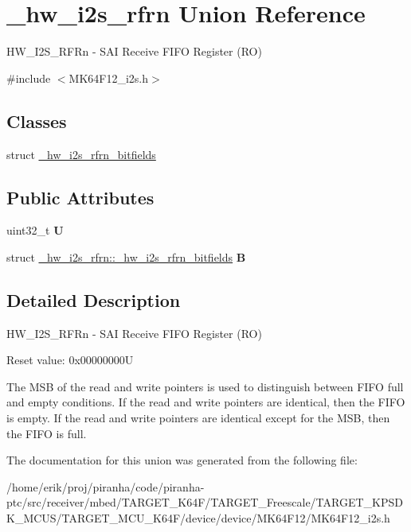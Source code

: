 \hypertarget{union__hw__i2s__rfrn}{}\section{\+\_\+hw\+\_\+i2s\+\_\+rfrn Union Reference}
\label{union__hw__i2s__rfrn}


H\+W\+\_\+\+I2\+S\+\_\+\+R\+F\+Rn -\/ S\+AI Receive F\+I\+FO Register (RO)  




{\ttfamily \#include $<$M\+K64\+F12\+\_\+i2s.\+h$>$}

\subsection*{Classes}
\begin{DoxyCompactItemize}
\item 
struct \hyperlink{struct__hw__i2s__rfrn_1_1__hw__i2s__rfrn__bitfields}{\+\_\+hw\+\_\+i2s\+\_\+rfrn\+\_\+bitfields}
\end{DoxyCompactItemize}
\subsection*{Public Attributes}
\begin{DoxyCompactItemize}
\item 
uint32\+\_\+t {\bfseries U}\hypertarget{union__hw__i2s__rfrn_a79e7873c4dde1c509c0311c74abdf212}{}\label{union__hw__i2s__rfrn_a79e7873c4dde1c509c0311c74abdf212}

\item 
struct \hyperlink{struct__hw__i2s__rfrn_1_1__hw__i2s__rfrn__bitfields}{\+\_\+hw\+\_\+i2s\+\_\+rfrn\+::\+\_\+hw\+\_\+i2s\+\_\+rfrn\+\_\+bitfields} {\bfseries B}\hypertarget{union__hw__i2s__rfrn_a9d8183bee5ad53a7bcca7245e25b3826}{}\label{union__hw__i2s__rfrn_a9d8183bee5ad53a7bcca7245e25b3826}

\end{DoxyCompactItemize}


\subsection{Detailed Description}
H\+W\+\_\+\+I2\+S\+\_\+\+R\+F\+Rn -\/ S\+AI Receive F\+I\+FO Register (RO) 

Reset value\+: 0x00000000U

The M\+SB of the read and write pointers is used to distinguish between F\+I\+FO full and empty conditions. If the read and write pointers are identical, then the F\+I\+FO is empty. If the read and write pointers are identical except for the M\+SB, then the F\+I\+FO is full. 

The documentation for this union was generated from the following file\+:\begin{DoxyCompactItemize}
\item 
/home/erik/proj/piranha/code/piranha-\/ptc/src/receiver/mbed/\+T\+A\+R\+G\+E\+T\+\_\+\+K64\+F/\+T\+A\+R\+G\+E\+T\+\_\+\+Freescale/\+T\+A\+R\+G\+E\+T\+\_\+\+K\+P\+S\+D\+K\+\_\+\+M\+C\+U\+S/\+T\+A\+R\+G\+E\+T\+\_\+\+M\+C\+U\+\_\+\+K64\+F/device/device/\+M\+K64\+F12/M\+K64\+F12\+\_\+i2s.\+h\end{DoxyCompactItemize}
